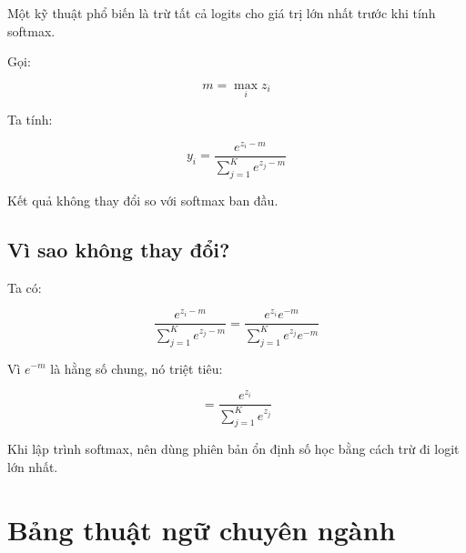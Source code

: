 \documentclass[12pt,a4paper]{report}
\begin{document}
Một kỹ thuật phổ biến là trừ tất cả logits cho giá trị lớn nhất trước khi tính softmax.

Gọi:

\[
    m = \max_i z_i
\]

Ta tính:

\[
    y_i =
    \frac{e^{z_i-m}}
    {\sum_{j=1}^{K} e^{z_j-m}}
\]

Kết quả không thay đổi so với softmax ban đầu.

\section{Vì sao không thay đổi?}

Ta có:

\[
    \frac{e^{z_i-m}}
    {\sum_{j=1}^{K}e^{z_j-m}}
    =
    \frac{e^{z_i}e^{-m}}
    {\sum_{j=1}^{K}e^{z_j}e^{-m}}
\]

Vì $e^{-m}$ là hằng số chung, nó triệt tiêu:

\[
    =
    \frac{e^{z_i}}
    {\sum_{j=1}^{K}e^{z_j}}
\]

\begin{ghinho}
Khi lập trình softmax, nên dùng phiên bản ổn định số học bằng cách trừ đi logit lớn nhất.
\end{ghinho}

\chapter{Bảng thuật ngữ chuyên ngành}
\end{document}
